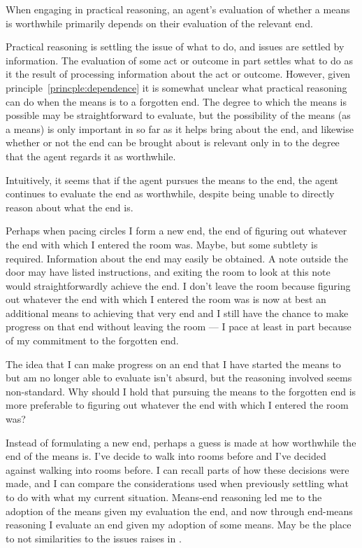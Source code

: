 \documentclass[10pt]{article}
\begin{document}
\begin{principle}\label{princple:dependence}
  When engaging in practical reasoning, an agent's evaluation of whether a means is worthwhile primarily depends on their evaluation of the relevant end.
\end{principle}

Practical reasoning is settling the issue of what to do, and issues are settled by information.
The evaluation of some act or outcome in part settles what to do as it the result of processing information about the act or outcome.
However, given principle~\ref{princple:dependence} it is somewhat unclear what practical reasoning can do when the means is to a forgotten end.
The degree to which the means is possible may be straightforward to evaluate, but the possibility of the means (as a means) is only important in so far as it helps bring about the end, and likewise whether or not the end can be brought about is relevant only in to the degree that the agent regards it as worthwhile.

Intuitively, it seems that if the agent pursues the means to the end, the agent continues to evaluate the end as worthwhile, despite being unable to directly reason about what the end is.

Perhaps when pacing circles I form a new end, the end of figuring out whatever the end with which I entered the room was.
Maybe, but some subtlety is required.
Information about the end may easily be obtained.
A note outside the door may have listed instructions, and exiting the room to look at this note would straightforwardly achieve the end.
I don't leave the room because figuring out whatever the end with which I entered the room was is now at best an additional means to achieving that very end and I still have the chance to make progress on that end without leaving the room --- I pace at least in part because of my commitment to the forgotten end.

The idea that I can make progress on an end that I have started the means to but am no longer able to evaluate isn't absurd, but the reasoning involved seems non-standard.
Why should I hold that pursuing the means to the forgotten end is more preferable to figuring out whatever the end with which I entered the room was?

Instead of formulating a new end, perhaps a guess is made at how worthwhile the end of the means is.
I've decide to walk into rooms before and I've decided against walking into rooms before.
I can recall parts of how these decisions were made, and I can compare the considerations used when previously settling what to do with what my current situation.
Means-end reasoning led me to the adoption of the means given my evaluation the end, and now through end-means reasoning I evaluate an end given my adoption of some means.
{\color{red} May be the place to not similarities to the issues \citeauthor{Paul:2014aa} raises in .}
\end{document}
